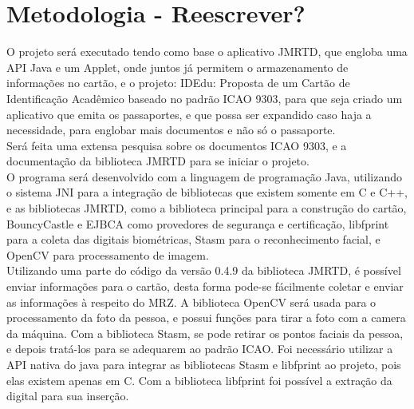 \documentclass{article}
\begin{document}
	\section{Metodologia - Reescrever?}
		\begin{justify}
			
		\hspace{2cm}O projeto será executado tendo como base o aplicativo JMRTD\cite{JMRTD}, que engloba uma API Java e um Applet, onde juntos já permitem o armazenamento de informações no cartão, e o projeto: IDEdu: Proposta de um Cartão de Identificação Acadêmico\cite{SASSO} baseado no padrão ICAO 9303\cite{ICAO}, para que seja criado um aplicativo que emita os passaportes, e que possa ser expandido caso haja a necessidade, para englobar mais documentos e não só o passaporte.\\
		\hspace*{2cm}Será feita uma extensa pesquisa sobre os documentos ICAO 9303\cite{ICAO}, e a documentação da biblioteca JMRTD para se iniciar o projeto.\\
		\hspace*{2cm}O programa será desenvolvido com a linguagem de programação Java, utilizando o sistema JNI para a integração de bibliotecas que existem somente em C e C++, e as bibliotecas JMRTD, como a biblioteca principal para a construção do cartão, BouncyCastle\cite{BOUNCYCASTLE} e EJBCA\cite{EJBCA} como provedores de segurança e certificação, libfprint\cite{PRINT} para a coleta das digitais biométricas, Stasm\cite{STASM} para o reconhecimento facial, e OpenCV\cite{OPENCV} para processamento de imagem.\\
		\hspace*{2cm}Utilizando uma parte do código da versão 0.4.9 da biblioteca JMRTD, é possível enviar informações para o cartão, desta forma pode-se fácilmente coletar e enviar as informações à respeito do MRZ. A biblioteca OpenCV será usada para o processamento da foto da pessoa, e possui funções para tirar a foto com a camera da máquina. Com a biblioteca Stasm, se pode retirar os pontos faciais da pessoa, e depois tratá-los para se adequarem ao padrão ICAO. Foi necessário utilizar a API nativa do java para integrar as bibliotecas Stasm e libfprint ao projeto, pois elas existem apenas em C. Com a biblioteca libfprint foi possível a extração da digital para sua inserção.

		\end{justify}
\end{document}
